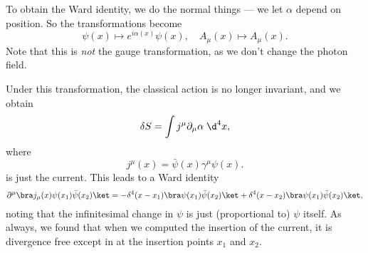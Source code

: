 \documentclass[a4paper]{article}
\begin{document}
To obtain the Ward identity, we do the normal things --- we let $\alpha$ depend on position. So the transformations become
\[
  \psi (x) \mapsto e^{i\alpha (x)} \psi(x),\quad A_\mu(x) \mapsto A_\mu(x).
\]
Note that this is \emph{not} the gauge transformation, as we don't change the photon field.

Under this transformation, the classical action is no longer invariant, and we obtain
\[
  \delta S = \int j^\mu \partial_\mu \alpha \;\d^4 x,
\]
where
\[
  j^\mu (x) = \bar\psi (x) \gamma^\mu \psi(x).
\]
is just the current. This leads to a Ward identity
\[
  \partial^\mu \bra j_\mu(x) \psi(x_1) \bar\psi(x_2)\ket = - \delta^4(x - x_1) \bra \psi(x_1) \bar\psi(x_2)\ket + \delta^4(x - x_2) \bra \psi(x_1) \bar\psi(x_2)\ket,
\]
noting that the infinitesimal change in $\psi$ is just (proportional to) $\psi$ itself. As always, we found that when we computed the insertion of the current, it is divergence free except in at the insertion points $x_1$ and $x_2$.
\end{document}
